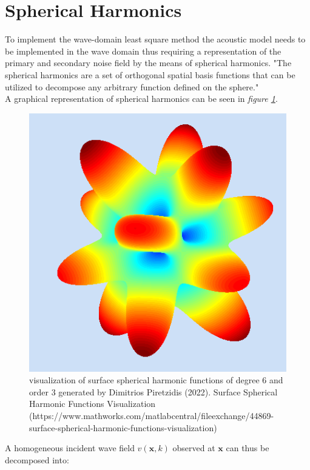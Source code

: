 \section{Spherical Harmonics}
To implement the wave-domain least square method the acoustic model needs to be implemented in the wave domain thus requiring a representation of the primary and secondary noise field by the means of spherical harmonics.
"The spherical harmonics are a set of orthogonal spatial basis functions that can be utilized
to decompose any arbitrary function defined on the sphere."\cite{Samarasinghe2018}\\ A graphical representation of spherical harmonics can be seen in \textit{figure \ref{fig:sph_harmonics}}.\\
\begin{figure}
    \centerline{\includegraphics[width=1.3\textwidth,keepaspectratio]{LaTeX/images/plots/spherical_hamonics.png}}
    \caption{visualization of surface spherical harmonic functions of degree 6 and order 3 generated by Dimitrios Piretzidis (2022). Surface Spherical Harmonic Functions Visualization (https://www.mathworks.com/matlabcentral/fileexchange/44869-surface-spherical-harmonic-functions-visualization)}
    \label{fig:sph_harmonics}
\end{figure}
A homogeneous incident wave field $v(\mathbf{x},k)$ observed at $\mathbf{x}$ can thus be decomposed into\cite{Zhang2019}:
